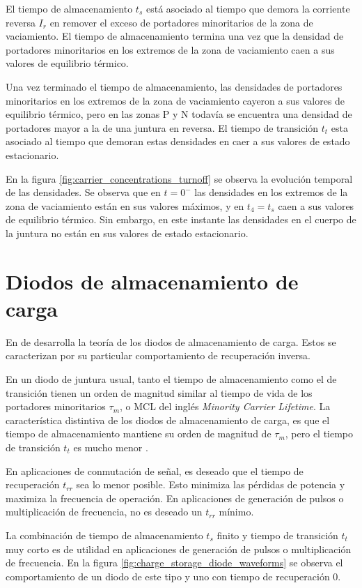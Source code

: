 El tiempo de almacenamiento $t_s$ está asociado al tiempo que demora la
corriente reversa $I_r$ en remover el exceso de portadores minoritarios de la
zona de vaciamiento. El tiempo de almacenamiento termina una vez que la densidad
de portadores minoritarios en los extremos de la zona de vaciamiento caen a sus
valores de equilibrio térmico.

Una vez terminado el tiempo de almacenamiento, las densidades de portadores
minoritarios en los extremos de la zona de vaciamiento cayeron a sus valores de
equilibrio térmico, pero en las zonas P y N todavía se encuentra una densidad de
portadores mayor a la de una juntura en reversa. El tiempo de transición $t_t$
esta asociado al tiempo que demoran estas densidades en caer a sus valores de
estado estacionario.

En la figura \ref{fig:carrier_concentrations_turnoff} se observa la evolución
temporal de las densidades. Se observa que en $t=0^-$ las densidades en los
extremos de la zona de vaciamiento están en sus valores máximos, y en $t_4=t_s$
caen a sus valores de equilibrio térmico. Sin embargo, en este instante las
densidades en el cuerpo de la juntura no están en sus valores de estado
estacionario.

\section{Diodos de almacenamiento de carga}
\label{sec:charge_storage_diodes}

En \cite{moll1962} de desarrolla la teoría de los diodos de almacenamiento de
carga. Estos se caracterizan por su particular comportamiento de recuperación
inversa.

En un diodo de juntura usual, tanto el tiempo de almacenamiento como el de
transición tienen un orden de magnitud similar al tiempo de vida de los
portadores minoritarios $\tau_m$, o MCL del inglés \textit{Minority Carrier
Lifetime}. La característica distintiva de los diodos de almacenamiento de
carga, es que el tiempo de almacenamiento mantiene su orden de magnitud de
$\tau_m$, pero el tiempo de transición $t_t$ es mucho menor \cite{moll1962}.

En aplicaciones de conmutación de señal, es deseado que el tiempo de
recuperación $t_{rr}$ sea lo menor posible. Esto minimiza las pérdidas de
potencia y maximiza la frecuencia de operación. En aplicaciones de generación de
pulsos o multiplicación de frecuencia, no es deseado un $t_{rr}$ mínimo.

La combinación de tiempo de almacenamiento $t_s$ finito y tiempo de transición
$t_t$ muy corto es de utilidad en aplicaciones de generación de pulsos o
multiplicación de frecuencia. En la figura
\ref{fig:charge_storage_diode_waveforms} se observa el comportamiento de un
diodo de este tipo y uno con tiempo de recuperación 0.

